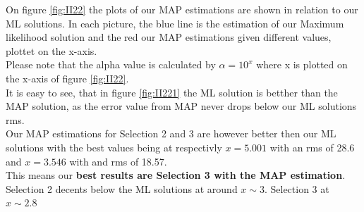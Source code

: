 \documentclass{article}
\begin{document}
On figure \ref{fig:II22} the plots of our MAP estimations are shown in relation
to our ML solutions. In each picture, the blue line is the estimation of    
our Maximum likelihood solution and the red our MAP estimations given 
different values, plottet on the x-axis.\\
Please note that the alpha value is calculated by $\alpha = 10^{x} $ where x    
is plotted on the x-axis of figure \ref{fig:II22}.\\
It is easy to see, that in figure \ref{fig:II221} the ML solution is
betther than the MAP solution, as the error value from MAP 
never drops below our ML solutions rms.\\
Our MAP estimations for Selection 2 and 3 are however better then our ML solutions with the 
best values being at respectivly $x = 5.001$ with an rms of 28.6 and $x = 3.546$ with and rms of 18.57.\\
This means our \textbf{best results are Selection 3 with the MAP estimation}.
Selection 2 decents below the ML solutions at around $x \sim 3$. Selection 3 at $x \sim 2.8$

\end{document}
